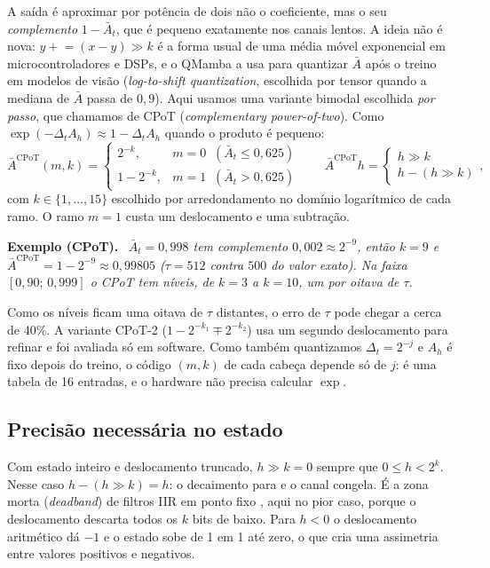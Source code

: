\documentclass[12pt]{article}
\newenvironment{exemplo}[1]{\par\smallskip\noindent\textbf{Exemplo (#1).}\ \itshape}{\par\smallskip}
\begin{document}
A saída é aproximar por potência de dois não o coeficiente, mas o seu \emph{complemento} $1 - \bar{A}_t$, que é pequeno exatamente nos canais lentos. A ideia não é nova: $y \mathrel{+}= (x - y) \gg k$ é a forma usual de uma média móvel exponencial em microcontroladores e DSPs, e o QMamba \cite{li2025qmamba} a usa para quantizar $\bar{A}$ após o treino em modelos de visão (\emph{log-to-shift quantization}, escolhida por tensor quando a mediana de $\bar{A}$ passa de $0{,}9$). Aqui usamos uma variante bimodal escolhida \emph{por passo}, que chamamos de CPoT (\emph{complementary power-of-two}). Como $\exp(-\Delta_t A_h) \approx 1 - \Delta_t A_h$ quando o produto é pequeno:
\begin{equation}
  \bar{A}^{\mathrm{CPoT}}(m,k) =
  \begin{cases}
    2^{-k},     & m = 0 \;\; (\bar{A}_t \leq 0{,}625)\\
    1 - 2^{-k}, & m = 1 \;\; (\bar{A}_t > 0{,}625)
  \end{cases}
  \qquad
  \bar{A}^{\mathrm{CPoT}} h = \begin{cases} h \gg k\\ h - (h \gg k)\end{cases},
  \label{eq:cpot}
\end{equation}
com $k \in \{1,\dots,15\}$ escolhido por arredondamento no domínio logarítmico de cada ramo. O ramo $m=1$ custa um deslocamento e uma subtração.

\begin{exemplo}{CPoT}
$\bar{A}_t = 0{,}998$ tem complemento $0{,}002 \approx 2^{-9}$, então $k = 9$ e $\bar{A}^{\mathrm{CPoT}} = 1 - 2^{-9} \approx 0{,}99805$ ($\tau = 512$ contra $500$ do valor exato). Na faixa $[0{,}90;\,0{,}999]$ o CPoT tem \LevelsCpot{} níveis, de $k=3$ a $k=10$, um por oitava de $\tau$.
\end{exemplo}

Como os níveis ficam uma oitava de $\tau$ distantes, o erro de $\tau$ pode chegar a cerca de 40\%. A variante CPoT-2 ($1 - 2^{-k_1} \mp 2^{-k_2}$) usa um segundo deslocamento para refinar e foi avaliada só em software. Como também quantizamos $\Delta_t = 2^{-j}$ e $A_h$ é fixo depois do treino, o código $(m,k)$ de cada cabeça depende só de $j$: é uma tabela de 16 entradas, e o hardware não precisa calcular $\exp$.

\subsection{Precisão necessária no estado}
\label{sec:precisao}
Com estado inteiro e deslocamento truncado, $h \gg k = 0$ sempre que $0 \leq h < 2^k$. Nesse caso $h - (h \gg k) = h$: o decaimento para e o canal congela. É a zona morta (\emph{deadband}) de filtros IIR em ponto fixo \cite{oppenheim2010dtsp}, aqui no pior caso, porque o deslocamento descarta todos os $k$ bits de baixo. Para $h < 0$ o deslocamento aritmético dá $-1$ e o estado sobe de 1 em 1 até zero, o que cria uma assimetria entre valores positivos e negativos.
\end{document}
